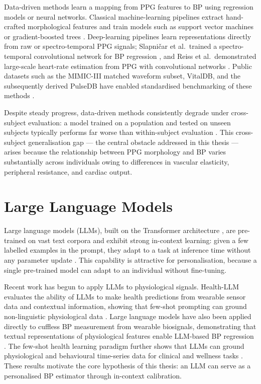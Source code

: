 Data-driven methods learn a mapping from PPG features to BP using regression models or neural networks. Classical machine-learning pipelines extract hand-crafted morphological features and train models such as support vector machines or gradient-boosted trees \citep{kachuee2017}. Deep-learning pipelines learn representations directly from raw or spectro-temporal PPG signals; Slapni\v{c}ar et al.\ trained a spectro-temporal convolutional network for BP regression \citep{slapnicar2019}, and Reiss et al.\ demonstrated large-scale heart-rate estimation from PPG with convolutional networks \citep{deepppg2019}. Public datasets such as the MIMIC-III matched waveform subset, VitalDB, and the subsequently derived PulseDB have enabled standardised benchmarking of these methods \citep{mimic2016,vitaldb2022,pulsedb2023}.

Despite steady progress, data-driven methods consistently degrade under cross-subject evaluation: a model trained on a population and tested on unseen subjects typically performs far worse than within-subject evaluation \citep{kachuee2017}. This cross-subject generalisation gap --- the central obstacle addressed in this thesis --- arises because the relationship between PPG morphology and BP varies substantially across individuals owing to differences in vascular elasticity, peripheral resistance, and cardiac output.

\section{Large Language Models}

Large language models (LLMs), built on the Transformer architecture \citep{vaswani2017}, are pre-trained on vast text corpora and exhibit strong in-context learning: given a few labelled examples in the prompt, they adapt to a task at inference time without any parameter update \citep{brown2020}. This capability is attractive for personalisation, because a single pre-trained model can adapt to an individual without fine-tuning.

Recent work has begun to apply LLMs to physiological signals. Health-LLM evaluates the ability of LLMs to make health predictions from wearable sensor data and contextual information, showing that few-shot prompting can ground non-linguistic physiological data \citep{healthllm2024}. Large language models have also been applied directly to cuffless BP measurement from wearable biosignals, demonstrating that textual representations of physiological features enable LLM-based BP regression \citep{llmbp2024}. The few-shot health learning paradigm further shows that LLMs can ground physiological and behavioural time-series data for clinical and wellness tasks \citep{fewshothealth2023}. These results motivate the core hypothesis of this thesis: an LLM can serve as a personalised BP estimator through in-context calibration.

